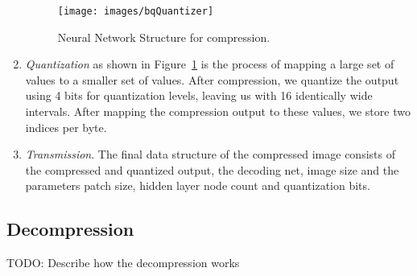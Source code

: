 \begin{enumerate}
\begin{figure}[tbh]
  \centering
  \texttt{[image: images/bqQuantizer]}
  \caption{Neural Network Structure for compression.}
  \label{fig:bpQuantizer}
\end{figure}

\item \emph{Quantization} as shown in Figure~\ref{fig:bpQuantizer} is the process of mapping a large set of values to a smaller set of values. After compression, we quantize the output using 4 bits for quantization levels, leaving us with 16 identically wide intervals. After mapping the compression output to these values, we store two indices per byte.

\item \emph{Transmission}. The final data structure of the compressed image consists of the compressed and quantized output, the decoding net, image size and the parameters patch size, hidden layer node count and quantization bits.
\end{enumerate}

\subsection{Decompression}
\label{sec:decompAlg}
{\color{red} TODO: Describe how the decompression works}
